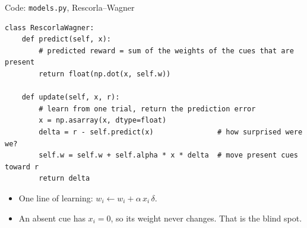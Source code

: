 \documentclass[aspectratio=169,11pt]{beamer}
\begin{document}
\begin{frame}[fragile]{Code: \texttt{models.py}, Rescorla--Wagner}
\begin{lstlisting}
class RescorlaWagner:
    def predict(self, x):
        # predicted reward = sum of the weights of the cues that are present
        return float(np.dot(x, self.w))

    def update(self, x, r):
        # learn from one trial, return the prediction error
        x = np.asarray(x, dtype=float)
        delta = r - self.predict(x)               # how surprised were we?
        self.w = self.w + self.alpha * x * delta  # move present cues toward r
        return delta
\end{lstlisting}
\vspace{0.6em}
\begin{itemize}
\item One line of learning: $w_i \leftarrow w_i + \alpha\,x_i\,\delta$.
\item An absent cue has $x_i = 0$, so its weight \alert{never changes}. That is the blind spot.
\end{itemize}
\end{frame}
\end{document}
